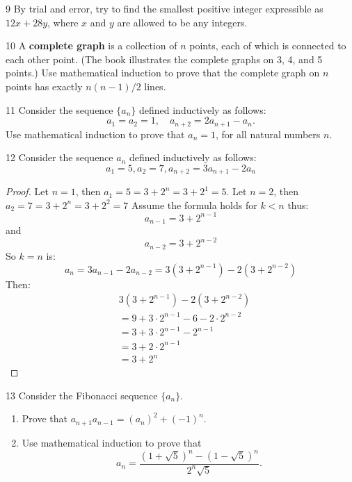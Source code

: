 \begin{problem}{9}
    By trial and error, try to find the smallest positive integer expressible as
    $12x + 28y$, where $x$ and $y$ are allowed to be any integers.
\end{problem}
\unsolved

\begin{problem}{10}
    A \textbf{complete graph} is a collection of $n$ points, each of which is connected
    to each other point. (The book illustrates the complete graphs on 3, 4, and 5 points.)
    Use mathematical induction to prove that the complete graph on $n$ points has
    exactly $n(n - 1)/2$ lines.
\end{problem}
\unsolved

\begin{problem}{11}
    Consider the sequence $\{a_n\}$ defined inductively as follows:
    \[a_1 = a_2 = 1, \quad a_{n + 2} = 2a_{n + 1} - a_n.\]
    Use mathematical induction to prove that $a_n = 1$, for all natural numbers $n$.
\end{problem}
\unsolved

\begin{problem}{12}
    Consider the sequence ${a_n}$ defined inductively as follows:
    \[a_1 = 5, a_2  = 7, a_{n + 2} = 3a_{n + 1} - 2a_n\]
\end{problem}
\solved

\begin{proof}
    Let $n = 1$, then $a_1 = 5 = 3 + 2^n =  3 + 2^1 = 5$.
    Let $n = 2$, then $a_2 = 7 = 3 + 2^n = 3 + 2^2 = 7$
    Assume the formula holds for $k < n$ thus:
    \[a_{n - 1} = 3 + 2^{n - 1}\]
    and 
    \[a_{n - 2} = 3 + 2^{n - 2}\]
    So $k = n$ is:
    \[a_{n} = 3a_{n - 1} - 2a_{n - 2} = 3(3 + 2^{n - 1}) - 2(3 + 2^{n - 2})\]
    Then:
    \begin{align*}
         & 3(3 + 2^{n - 1}) - 2(3 + 2^{n - 2})             \\
         & = 9 + 3 \cdot 2^{n - 1} - 6 - 2 \cdot 2^{n - 2} \\
         & = 3 + 3 \cdot 2^{n - 1} - 2^{n - 1}             \\
         & = 3 + 2 \cdot 2^{n - 1}                         \\
         & = 3 + 2^n                            
    \end{align*}
\end{proof}

\begin{problem}{13}
    Consider the Fibonacci sequence $\{a_n\}$.
    \begin{enumerate}
        \item[(a)] Prove that $a_{n + 1}a_{n - 1} = {(a_n)}^2 + {(-1)}^n$.
        \item[(b)] Use mathematical induction to prove that
        \[a_n = \frac{{(1 + \sqrt{5})}^n - {(1 - \sqrt{5})}^n}{2^n\sqrt{5}}.\]
    \end{enumerate}
\end{problem}
\unsolved

